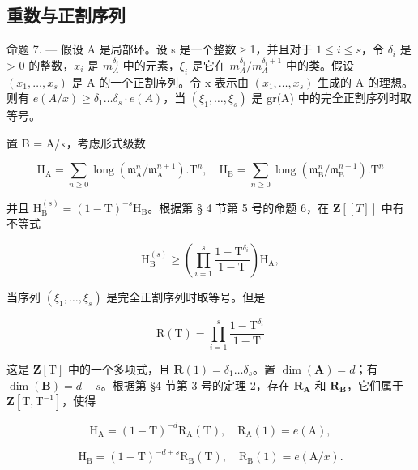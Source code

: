 \subsection{重数与正割序列}

命题 7. --- 假设 A 是局部环。设 s 是一个整数 ≥ 1，并且对于 \(1 \leqslant i \leqslant s\)，令 \(\delta_{i}\) 是 \textgreater{} 0 的整数，\(x_{i}\) 是 \(m_{A}^{\delta_{i}}\) 中的元素，\(\xi_{i}\) 是它在 \(m_{A}^{\delta_{i}}/m_{A}^{\delta_{i}+1}\) 中的类。假设 \((x_{1}, \ldots, x_{s})\) 是 A 的一个正割序列。令 x 表示由 \((x_{1}, \ldots, x_{s})\) 生成的 A 的理想。则有 \(e(A/x) \geqslant \delta_{1} \ldots \delta_{s} \cdot e(A)\)，当 \((\xi_{1}, \ldots, \xi_{s})\) 是 gr(A) 中的完全正割序列时取等号。

置 B = A/x，考虑形式级数

\[
\mathrm{H} _ {\mathrm{A}} = \sum_ {n \geqslant 0} \operatorname{long} (\mathfrak {m} _ {\mathrm{A}} ^ {n} / \mathfrak {m} _ {\mathrm{A}} ^ {n + 1}). \mathrm{T} ^ {n}, \quad \mathrm{H} _ {\mathrm{B}} = \sum_ {n \geqslant 0} \operatorname{long} (\mathfrak {m} _ {\mathrm{B}} ^ {n} / \mathfrak {m} _ {\mathrm{B}} ^ {n + 1}). \mathrm{T} ^ {n}
\]

并且 \(\mathrm{H}_{\mathrm{B}}^{(s)} = (1 - \mathrm{T})^{-s}\mathrm{H}_{\mathrm{B}}\)。根据第 § 4 节第 5 号的命题 6，在 \(\mathbf{Z}[[T]]\) 中有不等式

\[
\mathrm{H} _ {\mathrm{B}} ^ {(s)} \geqslant \left(\prod_ {i = 1} ^ {s} \frac {1 - \mathrm{T} ^ {\delta_ {i}}}{1 - \mathrm{T}}\right) \mathrm{H} _ {\mathrm{A}},
\]

当序列 \((\xi_{1}, \ldots, \xi_{s})\) 是完全正割序列时取等号。但是

\[
\mathrm{R(T)} = \prod_ {i = 1} ^ {s} \frac {1 - \mathrm{T} ^ {\delta_ {i}}}{1 - \mathrm{T}}
\]

这是 \(\mathbf{Z}[\mathrm{T}]\) 中的一个多项式，且 \(\mathbf{R}(1) = \delta_1 \ldots \delta_s\)。置 \(\dim(\mathbf{A}) = d\)；有 \(\dim(\mathbf{B}) = d - s\)。根据第 §4 节第 3 号的定理 2，存在 \(\mathbf{R}_{\mathbf{A}}\) 和 \(\mathbf{R}_{\mathbf{B}}\)，它们属于 \(\mathbf{Z}[\mathrm{T}, \mathrm{T}^{-1}]\)，使得

\[
\mathrm{H} _ {\mathrm{A}} = (1 - \mathrm{T}) ^ {- d} \mathrm{R} _ {\mathrm{A}} (\mathrm{T}), \quad \mathrm{R} _ {\mathrm{A}} (1) = e (\mathrm{A}),
\]

\[
\mathrm{H} _ {\mathrm{B}} = (1 - \mathrm{T}) ^ {- d + s} \mathrm{R} _ {\mathrm{B}} (\mathrm{T}), \quad \mathrm{R} _ {\mathrm{B}} (1) = e (\mathrm{A} / x).
\]

